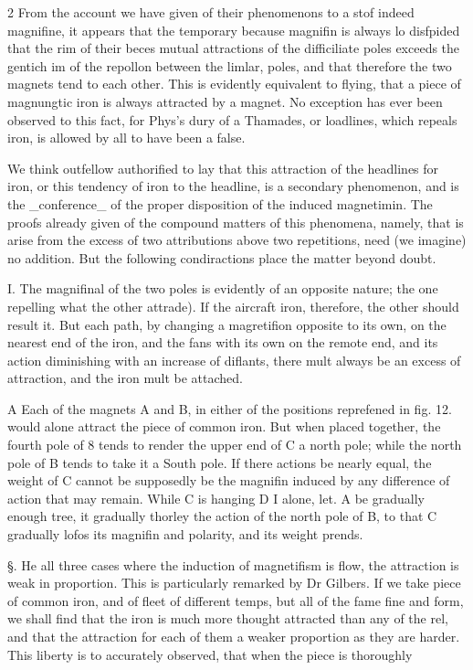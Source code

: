 \documentclass[10pt]{article}
\begin{document}
\begin{multicols}{2}
From the account we have given of their phenomenons to a stof indeed magnifine, it appears that the temporary because magnifin is always lo disfpided that the rim of their beces mutual attractions of the difficiliate poles exceeds the gentich im of the repollon between the limlar, poles, and that therefore the two magnets tend to each other. This is evidently equivalent to flying, that a piece of magnungtic iron is always attracted by a magnet. No exception has ever been observed to this fact, for Phys's dury of a Thamades, or loadlines, which repeals iron, is allowed by all to have been a false.

We think outfellow authorified to lay that this attraction of the headlines for iron, or this tendency of iron to the headline, is a secondary phenomenon, and is the \_conference\_ of the proper disposition of the induced magnetimin. The proofs already given of the compound matters of this phenomena, namely, that is arise from the excess of two attributions above two repetitions, need (we imagine) no addition. But the following condiractions place the matter beyond doubt.

I. The magnifinal of the two poles is evidently of an opposite nature; the one repelling what the other attrade). If the aircraft iron, therefore, the other should result it. But each path, by changing a magretifion opposite to its own, on the nearest end of the iron, and the fans with its own on the remote end, and its action diminishing with an increase of diflants, there mult always be an excess of attraction, and the iron mult be attached.

A Each of the magnets A and B, in either of the positions reprefened in fig. 12. would alone attract the piece of common iron. But when placed together, the fourth pole of 8 tends to render the upper end of C a north pole; while the north pole of B tends to take it a South pole. If there actions be nearly equal, the weight of C cannot be supposedly be the magnifin induced by any difference of action that may remain. While C is hanging D I alone, let. A be gradually enough tree, it gradually thorley the action of the north pole of B, to that C gradually lofos its magnifin and polarity, and its weight prends.

§. He all three cases where the induction of magnetifism is flow, the attraction is weak in proportion. This is particularly remarked by Dr Gilbers. If we take piece of common iron, and of fleet of different temps, but all of the fame fine and form, we shall find that the iron is much more thought attracted than any of the rel, and that the attraction for each of them a weaker proportion as they are harder. This liberty is to accurately observed, that when the piece is thoroughly


\end{multicols}
\end{document}
